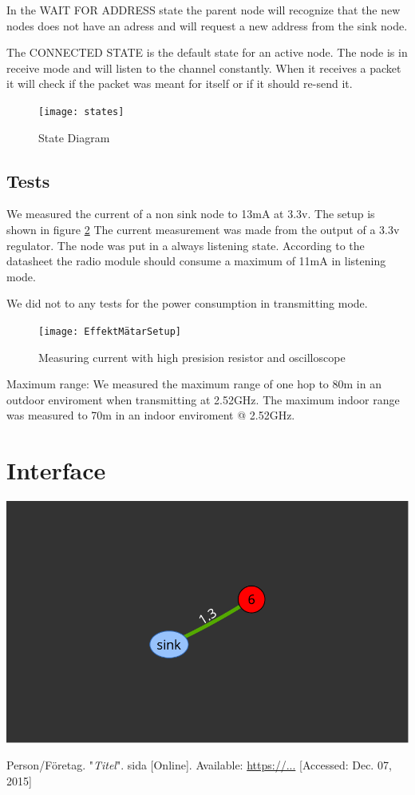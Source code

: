 \documentclass[a4paper,11pt]{article}
\begin{document}
In the WAIT FOR ADDRESS state the parent node will recognize that the
new nodes does not have an adress and will request a new address from
the sink node. 

The CONNECTED STATE is the default state for an active node. The node
is in receive mode and will listen to the channel constantly. When
it receives a packet it will check if the packet was meant for
itself or if it should re-send it.


\begin{figure}[h!]
  \texttt{[image: states]}
  \caption{State Diagram}
  \label{fig:state}
\end{figure}

\subsection{Tests}
We measured the current of a non sink node to 13mA at 3.3v. The setup
is shown in figure \ref{fig:Effekt} The current measurement was made from
the output of a 3.3v regulator.  The node was put in a always
listening state. According to the datasheet the radio module should
consume a maximum of 11mA in listening mode.

We did not to any tests for the power consumption in transmitting
mode.

\begin{figure}[h!]
  \texttt{[image: EffektMätarSetup]}
  \caption{Measuring current with high presision resistor and oscilloscope}
  \label{fig:Effekt}
\end{figure}

Maximum range:
We measured the maximum range of one hop to 80m in an outdoor 
enviroment when transmitting at 2.52GHz. 
The maximum indoor range was measured to 70m in an indoor
enviroment @ 2.52GHz.
 

\section{Interface}
\begin{center}
\includegraphics[width=.5\textwidth]{map}
\end{center}

\cite{label}

\begin{thebibliography}{2}

  Person/Företag. "\emph{Titel}". sida [Online]. Available: \url{https://...} [Accessed: Dec. 07, 2015]

\end{thebibliography}
\end{document}
